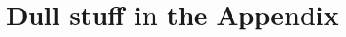 \documentclass[a4paper,11pt]{report}
\begin{document}
\appendix
%
\chapter{Dull stuff in the Appendix}
\def\localpath{ApA}


\sglspace

\pagestyle{bibheadings}


\end{document}
